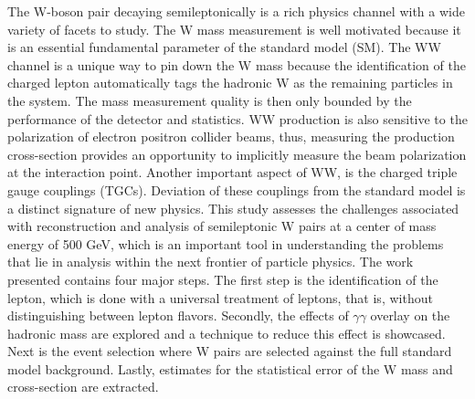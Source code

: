The W-boson pair decaying semileptonically is a rich physics channel with a wide variety of facets to study. The W mass measurement is well motivated because it is an essential fundamental parameter of the standard model (SM). The WW channel is a unique way to pin down the W mass because the identification of the charged lepton automatically tags the hadronic W as the remaining particles in the system. The mass measurement quality is then only bounded by the performance of the detector and statistics. WW production is also sensitive to the polarization of electron positron collider beams, thus,  measuring the production cross-section provides an opportunity to implicitly measure the beam polarization at the interaction point. Another important aspect of WW, is the charged triple gauge couplings (TGCs). Deviation of these couplings from the standard model is a distinct signature of new physics. This study assesses the challenges associated with reconstruction and analysis of semileptonic W pairs at a center of mass energy of 500 GeV, which is an important tool in understanding the problems that lie in analysis within the next frontier of particle physics. The work presented contains four major steps. The first step is the identification of the lepton, which is done with a universal treatment of leptons, that is, without distinguishing between lepton flavors.  Secondly, the effects of $\gamma\gamma$ overlay on the hadronic mass are explored and a technique to reduce this effect is showcased. Next is the event selection where W pairs are selected against the full standard model background. Lastly, estimates for the statistical error of the W mass and cross-section are extracted.